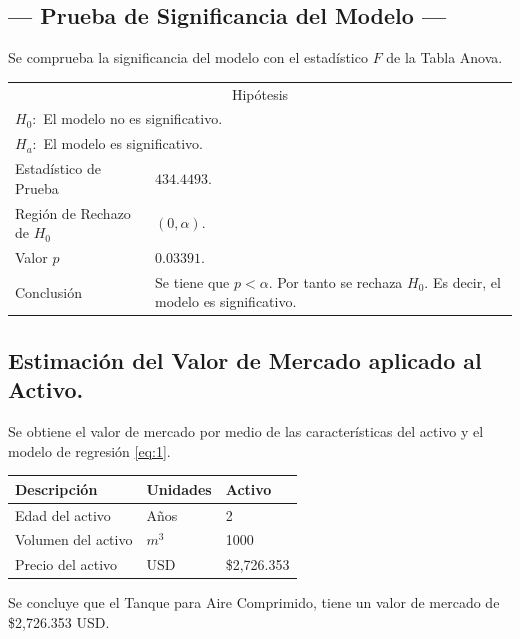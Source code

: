 \subsection{\centering --- Prueba de Significancia del Modelo ---} %
Se comprueba la significancia del modelo con el estadístico \(F\) de la Tabla Anova.
\begin{center}
  \begin{tabular}{|l|p{6cm}|}
    \cline{1-2}
    \multicolumn{2}{|c|}{Hipótesis}\\ \cline{1-2}
    \multicolumn{2}{|l|}{\(H_0:\) El modelo no es significativo.} \\ 
    \multicolumn{2}{|l|}{\(H_a:\) El modelo es significativo.} \\ \cline{1-2}
    Estadístico de Prueba & \(434.4493\).\\ \cline{1-2} 
		Región de Rechazo de \(H_0\) & \((0, \alpha )\).\\ \cline{1-2} 
    Valor \(p\) & \(0.03391\).\\ \cline{1-2} 
    Conclusión & Se tiene que \(p<\alpha\). \newline 
		Por tanto se rechaza \(H_0\). \newline 
		Es decir, el modelo es significativo.\\ \cline{1-2} 
  \end{tabular}
\end{center} 

\subsection{\centering Estimación del Valor de Mercado aplicado al Activo.} %
Se obtiene el valor de mercado por medio de las características del activo y el modelo de regresión \eqref{eq:1}.
\begin{center}
  \begin{tabular}{|l|l|l|}
    \hline 
		Descripción   & Unidades  & Activo \\ \hline 
    Edad del activo    & Años      & 2      \\ \hline 
		Volumen del activo & \(m ^ 3\) & 1000   \\ \hline 
		Precio del activo   & USD       & \$2,726.353  \\ \hline 
  \end{tabular}
\end{center} 
Se concluye que el Tanque para Aire Comprimido, tiene un valor de mercado de 
\$2,726.353 USD.

